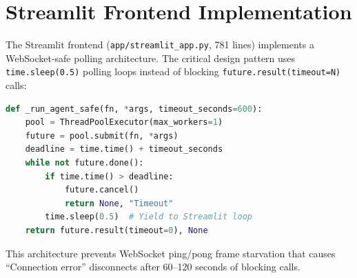 \section{Streamlit Frontend Implementation}

The Streamlit frontend (\texttt{app/streamlit\_app.py}, 781 lines) implements a WebSocket-safe polling architecture. The critical design pattern uses \texttt{time.sleep(0.5)} polling loops instead of blocking \texttt{future.result(timeout=N)} calls:

\begin{lstlisting}[language=Python, caption={WebSocket-Safe Agent Execution}, label={lst:websocket}]
def _run_agent_safe(fn, *args, timeout_seconds=600):
    pool = ThreadPoolExecutor(max_workers=1)
    future = pool.submit(fn, *args)
    deadline = time.time() + timeout_seconds
    while not future.done():
        if time.time() > deadline:
            future.cancel()
            return None, "Timeout"
        time.sleep(0.5)  # Yield to Streamlit loop
    return future.result(timeout=0), None
\end{lstlisting}

This architecture prevents WebSocket ping/pong frame starvation that causes ``Connection error'' disconnects after 60--120 seconds of blocking calls.

